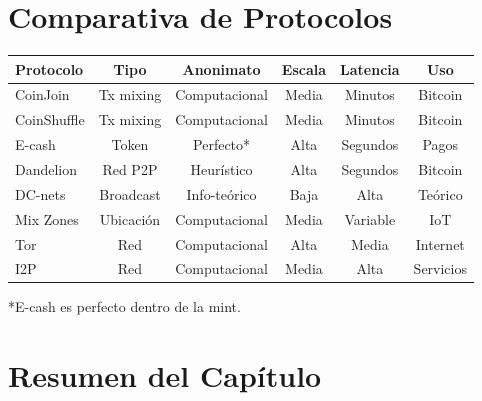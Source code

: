\documentclass[11pt,a4paper,twoside]{book}
\begin{document}
\section{Comparativa de Protocolos}
\label{sec:comparativa-anon}

\begin{center}
\small
\begin{tabular}{lccccc}
\toprule
\textbf{Protocolo} & \textbf{Tipo} & \textbf{Anonimato} & \textbf{Escala} & \textbf{Latencia} & \textbf{Uso} \\
\midrule
CoinJoin & Tx mixing & Computacional & Media & Minutos & Bitcoin \\
CoinShuffle & Tx mixing & Computacional & Media & Minutos & Bitcoin \\
E-cash & Token & Perfecto* & Alta & Segundos & Pagos \\
Dandelion & Red P2P & Heur\'istico & Alta & Segundos & Bitcoin \\
DC-nets & Broadcast & Info-te\'orico & Baja & Alta & Te\'orico \\
Mix Zones & Ubicaci\'on & Computacional & Media & Variable & IoT \\
Tor & Red & Computacional & Alta & Media & Internet \\
I2P & Red & Computacional & Media & Alta & Servicios \\
\bottomrule
\end{tabular}
\end{center}

*E-cash es perfecto dentro de la mint.

\section{Resumen del Cap\'itulo}
\label{sec:resumen-cap6}
\end{document}
